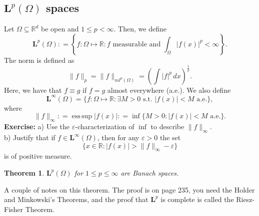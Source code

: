 \documentclass[12pt]{article}
\newtheorem{theorem}{Theorem}
\newcommand{\R}{{\mathbb R}}
\newcommand{\Om}{\Omega}
\newcommand{\dint}{\displaystyle\int}
\newcommand{\ml}{\mathbf{L}}
\newcommand{\sse}{\subseteq}
\newcommand{\lp}{\left(}
\newcommand{\rp}{\right)}
\newcommand{\llb}{\left\lbrace}
\newcommand{\rrb}{\right\rbrace}
\newcommand{\vtf}{{\vspace{-25pt}}}
\DeclareMathOperator*{\esssup}{ess\,sup}
\begin{document}
\subsection*{$\ml^p(\Om)$ spaces}
Let $\Om \sse \R^d$ be open and $1 \leq p < \infty$. Then, we define
\[ \ml^p(\Om) : = \llb f: \Om \mapsto \R : f \text{ measurable  and } \dint_{\Om} |f(x) |^p < \infty \rrb. \]
The norm is defined as 
\[ \| f \|_p = \| f \|_{ml^p(\Om)} = \lp \dint |f|^p \, dx \rp^{\frac{1}{p}}.\]
Here, we have that $f \equiv g$ if $f = g$ almost everywhere (a.e.). We also define 
\[
 \ml^{\infty}(\Om) = \{ f: \Om \mapsto \R : \exists M > 0 \text{ s.t. } |f(x)| < M \text{ a.e.} \}, 
 \]
where 
\[ 
\|f\|_{\infty} : = \esssup |f(x)| : = \inf \{ M > 0 :  |f(x)| < M \text{ a.e.}\}.
  \]
 {\bf  Exercise:} a) Use the $\varepsilon$-characterization of $\inf$ to describe  $\|f\|_{\infty}$. \\
 b) Justify  that if $f \in  \ml^{\infty}(\Om)$, then for any $\varepsilon>0$ the set 
 \[
 \{ x\in \R: |f(x)|>\|f\|_{\infty} - \varepsilon\}
 \]
  is of positive measure. 
 
\begin{theorem}
$\ml^p(\Om)$ for $1 \leq p \leq \infty$ are Banach spaces.
\end{theorem}
\vtf
A couple of notes on this theorem. The proof is on page 235, you need the Holder and Minkowski's Theorems, and the proof that $\ml^p$ is complete is called the Riesz-Fisher Theorem.  
\end{document}
